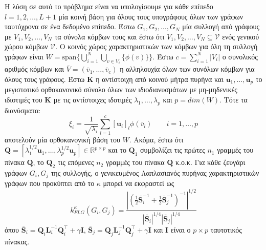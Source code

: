 Η λύση σε αυτό το πρόβλημα είναι να υπολογίσουμε για κάθε επίπεδο $l=1,2,\ldots,L+1$ μία κοινή βάση για όλους τους υπογράφους όλων των γράφων ταυτόχρονα σε ένα δεδομένο επίπεδο.
Έστω $G_1, G_2, \ldots, G_N$ μία συλλογή από γράφους με $V_1, V_2, \ldots, V_N$ τα σύνολα κόμβων τους και έστω ότι $V_1, V_2, \ldots, V_N \subseteq \mathcal{V}$ ενός γενικού χώρου κόμβων $\mathcal{V}$.
Ο κοινός χώρος χαρακτηριστικών των κόμβων για όλη τη συλλογή γράφων είναι $W = \text{span} \big\{ \bigcup_{i=1}^N \bigcup_{v \in V_i} \{ \phi(v) \} \big\}$.
Έστω $c = \sum_{i=1}^N |V_i|$ ο συνολικός αριθμός κόμβων και $\bar{V} = (\bar{v}_1, \ldots, \bar{v}_c)$ η αλληλουχία όλων των συνόλων κόμβων για όλους τους γράφους.
Έστω $\mathbf{K}$ η αντίστοιχη από κοινού μήτρα πυρήνα και $\mathbf{u}_1, \ldots, \mathbf{u}_p$ το μεγιστοτικό ορθοκανονικό σύνολο όλων των ιδιοδιανυσμάτων με μη-μηδενικές ιδιοτιμές του $\mathbf{K}$ με τις αντίστοιχες ιδοτιμές $\lambda_1,\ldots,\lambda_p$ και $p=dim(W)$.
Τότε τα διανύσματα:
\begin{equation}
    \xi_i = \frac{1}{\sqrt{\lambda_i}} \sum_{l=1}^c [\mathbf{u}_i]_l \phi(\bar{v}_l) \qquad i=1,\ldots,p
\end{equation}
αποτελούν μία ορθοκανονική βάση του $W$.
Ακόμα, έστω ότι $\mathbf{Q} = [ \lambda_1^{1/2} \mathbf{u}_1, \ldots, \lambda_p^{1/2} \mathbf{u}_p ] \in \mathbb{R}^{p \times p}$ και το $\mathbf{Q}_1$ συμβολίζει τις πρώτες $n_1$ γραμμές του πίνακα $\mathbf{Q}$, το $\mathbf{Q}_2$ τις επόμενες $n_2 $ γραμμές του πίνακα $\mathbf{Q}$ κ.ο.κ.
Για κάθε ζευγάρι γράφων $G_i, G_j$ της συλλογής, ο γενικευμένος Λαπλασιανός πυρήνας χαρακτηριστικών γράφων που προκύπτει από το $\kappa$ μπορεί να εκφραστεί ως
\begin{equation}
    k_{FLG}^\kappa(G_i, G_j) = \frac{| (\frac{1}{2} \bar{\mathbf{S}}_i^{-1} + \frac{1}{2} \bar{\mathbf{S}}_j^{-1} )^{-1} |^{1/2}}{|\bar{\mathbf{S}}_i|^{1/4} |\bar{\mathbf{S}}_j|^{1/4}} 
\end{equation}
όπου $\bar{\mathbf{S}}_i = \mathbf{Q}_i \mathbf{L}_i^{-1} \mathbf{Q}_i^\top + \gamma \mathbf{I}$, $\bar{\mathbf{S}}_j = \mathbf{Q}_j \mathbf{L}_j^{-1} \mathbf{Q}_j^\top + \gamma \mathbf{I}$ και $\mathbf{I}$ είναι ο $p \times p$ ταυτοτικός πίνακας.

